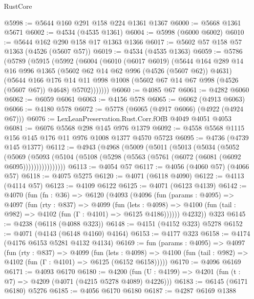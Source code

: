 \begin{lexlean}{RustCore}
\begin{coremodule}
@5998 := @5644 @160 @291 @158 @224 @1361 @1367
@6000 := @5668 @1361 @5671
@6002 := @4534 (@4535 @1361)
@6004 := @5998 (@6000 @6002)
@6010 := @5644 @162 @290 @158 @17 @1363 @1366
@6017 := @5602 @57 @158 @57 @1363 (@4526 (@5607 @57))
@6019 := @4534 (@4535 @1363)
@6059 := @5786
    (@5789
      (@5915
        (@5992
          (@6004
            (@6010
              (@6017 @6019)
              (@5644
                @164
                @289
                @14
                @16
                @996
                @1365
                (@5602 @62 @14 @62 @996 (@4526 (@5607 @62)) @4631)
                (@5644
                  @166
                  @176
                  @14
                  @11
                  @998
                  @1008
                  (@5602 @67 @14 @67 @998 (@4526 (@5607 @67)) @4648)
                  @5702)))))))
@6060 := @4085 @67
@6061 := @4282 @6060
@6062 := @6059 @6061
@6063 := @4156 @578
@6065 := @6062 (@4913 @6063)
@6066 := @4180 @578
@6072 := @5778 (@6065 (@4917 @6066) (@4922 (@4924 @67)))
@6076 := LexLeanPreservation.Rust.Corr.fOfB @4049 @4051 @4053
@6081 := @6076 @5568 @298 @145 @976 @1379
@6092 := @4558 @5568 @1115 @156 @145 @176 @11 @976 @1008 @1377 @4570 @5723
@6095 := @4736 (@4739 @145 @1377)
@6112 := @4943
    (@4968
      (@5009
        (@5011
          (@5013
            (@5034
              (@5052
                (@5069
                  (@5093
                    (@5104 (@5108 (@5298 (@5563 (@5761 (@6072 (@6081 (@6092 @6095))))))))))))))))
@6113 := @4054 @57
@6117 := @4056 (@4060 @57) (@4066 @57)
@6118 := @4075 @5275
@6120 := @4071 (@6118 @4090)
@6122 := @4113 (@4114 @57)
@6123 := @4109 @6122
@6125 := @4071 (@6123 @4139)
@6142 := @4070
    (fun (fn : @36) =>
    @6120
      (@4093
        (@4096
          (fun (params : @4095) =>
          @4097
            (fun (rty : @837) =>
            @4099
              (fun (lets : @4098) =>
              @4100 (fun (tail : @982) => @4102 (fun (Γ : @4101) => @6125 @4186))))))
        @4232))
    @323
@6145 := @4238 (@6118 (@4088 @323))
@6148 := @4151 (@4152 @323) @5278
@6152 := @4071 (@4143 (@6148 @4160) @4164)
@6153 := @4177 @323
@6158 := @4174 (@4176 @6153 @5281 @4132 @4134)
@6169 := fun (params : @4095) =>
  @4097
    (fun (rty : @837) =>
    @4099
      (fun (lets : @4098) =>
      @4100 (fun (tail : @982) => @4102 (fun (Γ : @4101) => @6125 (@6152 @6158)))))
@6170 := @4096 @6169
@6171 := @4093 @6170
@6180 := @4200 (fun (U : @4199) => @4201 (fun (t : @7) => @4209 (@4071 (@4215 @5278 @4089) @4226)))
@6183 := @6145 (@6171 @6180) @5276
@6185 := @4056 @6170 @6180
@6187 := @4287 @6169 @1388

\end{coremodule}
\end{lexlean}
